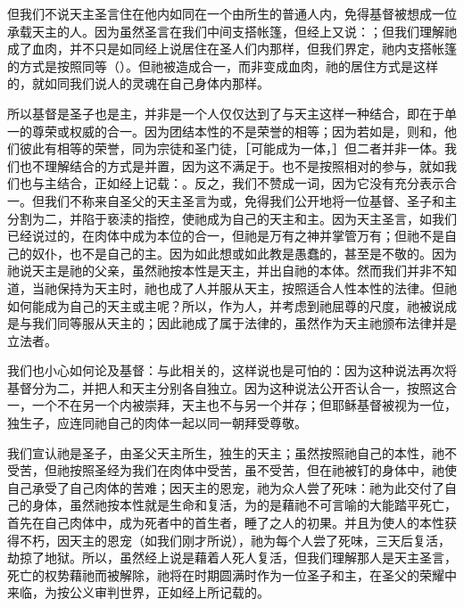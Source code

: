 但我们不说天主圣言住在他内如同在一个由所生的普通人内，免得基督被想成一位承载天主的人。因为虽然圣言在我们中间支搭帐篷，但经上又说：；但我们理解祂成了血肉，并不只是如同经上说居住在圣人们内那样，但我们界定，祂内支搭帐篷的方式是按照同等（）。但祂被造成合一，而非变成血肉，祂的居住方式是这样的，就如同我们说人的灵魂在自己身体内那样。\par

所以基督是圣子也是主，并非是一个人仅仅达到了与天主这样一种结合，即在于单一的尊荣或权威的合一。因为团结本性的不是荣誉的相等；因为若如是，则和，他们彼此有相等的荣誉，同为宗徒和圣门徒，［可能成为一体，］但二者并非一体。我们也不理解结合的方式是并置，因为这不满足于。也不是按照相对的参与，就如我们也与主结合，正如经上记载：。反之，我们不赞成一词，因为它没有充分表示合一。但我们不称来自圣父的天主圣言为或，免得我们公开地将一位基督、圣子和主分割为二，并陷于亵渎的指控，使祂成为自己的天主和主。因为天主圣言，如我们已经说过的，在肉体中成为本位的合一，但祂是万有之神并掌管万有；但祂不是自己的奴仆，也不是自己的主。因为如此想或如此教是愚蠢的，甚至是不敬的。因为祂说天主是祂的父亲，虽然祂按本性是天主，并出自祂的本体。然而我们并非不知道，当祂保持为天主时，祂也成了人并服从天主，按照适合人性本性的法律。但祂如何能成为自己的天主或主呢？所以，作为人，并考虑到祂屈尊的尺度，祂被说成是与我们同等服从天主的；因此祂成了属于法律的，虽然作为天主祂颁布法律并是立法者。\par

我们也小心如何论及基督：与此相关的，这样说也是可怕的：因为这种说法再次将基督分为二，并把人和天主分别各自独立。因为这种说法公开否认合一，按照这合一，一个不在另一个内被崇拜，天主也不与另一个并存；但耶稣基督被视为一位，独生子，应连同祂自己的肉体一起以同一朝拜受尊敬。\par

我们宣认祂是圣子，由圣父天主所生，独生的天主；虽然按照祂自己的本性，祂不受苦，但祂按照圣经为我们在肉体中受苦，虽不受苦，但在祂被钉的身体中，祂使自己承受了自己肉体的苦难；因天主的恩宠，祂为众人尝了死味：祂为此交付了自己的身体，虽然祂按本性就是生命和复活，为的是藉祂不可言喻的大能踏平死亡，首先在自己肉体中，成为死者中的首生者，睡了之人的初果。并且为使人的本性获得不朽，因天主的恩宠（如我们刚才所说），祂为每个人尝了死味，三天后复活，劫掠了地狱。所以，虽然经上说是藉着人死人复活，但我们理解那人是天主圣言，死亡的权势藉祂而被解除，祂将在时期圆满时作为一位圣子和主，在圣父的荣耀中来临，为按公义审判世界，正如经上所记载的。\par


